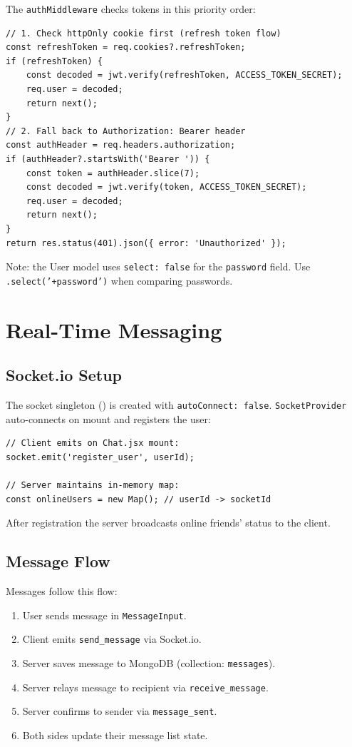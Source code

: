 \documentclass[12pt,a4paper]{article}
\newcommand{\code}[1]{\texttt{#1}}
\newcommand{\file}[1]{\texttt{\detokenize{#1}}}
\begin{document}
The \code{authMiddleware} checks tokens in this priority order:

\begin{lstlisting}[style=js]
// 1. Check httpOnly cookie first (refresh token flow)
const refreshToken = req.cookies?.refreshToken;
if (refreshToken) {
    const decoded = jwt.verify(refreshToken, ACCESS_TOKEN_SECRET);
    req.user = decoded;
    return next();
}
// 2. Fall back to Authorization: Bearer header
const authHeader = req.headers.authorization;
if (authHeader?.startsWith('Bearer ')) {
    const token = authHeader.slice(7);
    const decoded = jwt.verify(token, ACCESS_TOKEN_SECRET);
    req.user = decoded;
    return next();
}
return res.status(401).json({ error: 'Unauthorized' });
\end{lstlisting}

Note: the User model uses \code{select: false} for the \code{password} field.
Use \code{.select('+password')} when comparing passwords.

\section{Real-Time Messaging}
\label{sec:messaging}

\subsection{Socket.io Setup}
\label{sec:socket-setup}

The socket singleton (\file{client/src/socket.js}) is created with \code{autoConnect: false}.
\code{SocketProvider} auto-connects on mount and registers the user:

\begin{lstlisting}[style=js]
// Client emits on Chat.jsx mount:
socket.emit('register_user', userId);

// Server maintains in-memory map:
const onlineUsers = new Map(); // userId -> socketId
\end{lstlisting}

After registration the server broadcasts online friends' status to the client.

\subsection{Message Flow}
\label{sec:message-flow}

Messages follow this flow:

\begin{enumerate}
    \item User sends message in \code{MessageInput}.
    \item Client emits \code{send\_message} via Socket.io.
    \item Server saves message to MongoDB (collection: \code{messages}).
    \item Server relays message to recipient via \code{receive\_message}.
    \item Server confirms to sender via \code{message\_sent}.
    \item Both sides update their message list state.
\end{enumerate}
\end{document}

